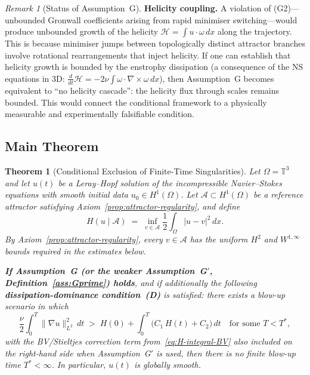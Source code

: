 \documentclass[12pt,a4paper]{article}
\theoremstyle{definition}
\theoremstyle{plain}
\newtheorem{theorem}[definition]{Theorem}
\theoremstyle{remark}
\newtheorem{remark}[definition]{Remark}
\begin{document}
\begin{remark}[Status of Assumption~G]
\medskip\noindent
\textbf{Helicity coupling.}\;
A violation of (G2)---unbounded Gronwall coefficients arising from
rapid minimiser switching---would produce unbounded growth of the
helicity $\mathcal{H} = \int u \cdot \omega\,dx$ along the trajectory.
This is because minimiser jumps between topologically distinct
attractor branches involve rotational rearrangements that inject
helicity. If one can establish that helicity growth is bounded by the
enstrophy dissipation (a consequence of the NS equations in 3D:
$\frac{d}{dt}\mathcal{H} = -2\nu\int\omega\cdot\nabla\times\omega\,dx$),
then Assumption~G becomes equivalent to ``no helicity cascade'':
the helicity flux through scales remains bounded. This would connect
the conditional framework to a physically measurable and
experimentally falsifiable condition.
\end{remark}

\subsection*{Main Theorem}
\begin{theorem}[Conditional Exclusion of Finite-Time Singularities]
\label{thm:main}
Let $\Omega = \mathbb{T}^3$ and let $u(t)$ be a Leray--Hopf solution of the
incompressible Navier--Stokes equations with smooth initial data
$u_0 \in H^1(\Omega)$.  Let $\mathcal{A} \subset H^1(\Omega)$ be a reference
attractor satisfying Axiom~\ref{prop:attractor-regularity}, and define
\[
    H\!\left(u\mid\mathcal{A}\right)
    \;=\; \inf_{v\in\mathcal{A}}\frac{1}{2}\int_\Omega |u-v|^2\,dx.
\]
By Axiom~\ref{prop:attractor-regularity}, every $v \in \mathcal{A}$ has the
uniform $H^2$ and $W^{1,\infty}$ bounds required in the estimates below.

\textbf{If Assumption~G \textup{(}or the weaker
Assumption~G$'$, Definition~\ref{ass:Gprime}\textup{)} holds},
and if additionally the following \textbf{dissipation-dominance
condition~(D)} is satisfied: there exists a blow-up scenario in which
\begingroup
\renewcommand{\theequation}{D}
\renewcommand{\theHequation}{D}
\begin{equation}\label{eq:diss-dom}
  \frac{\nu}{2}\int_0^T \|\nabla u\|_{L^2}^2\,dt
  \;>\;
  H(0)+
  \int_0^T \bigl(C_1\,H(t) + C_2\bigr)\,dt
  \quad \text{for some } T < T^*,
\end{equation}
\endgroup
with the BV/Stieltjes correction term from~\eqref{eq:H-integral-BV}
also included on the right-hand side when Assumption~G$'$ is used,
then there is no finite blow-up time $T^* < \infty$.  In particular,
$u(t)$ is globally smooth.
\end{theorem}
\end{document}

